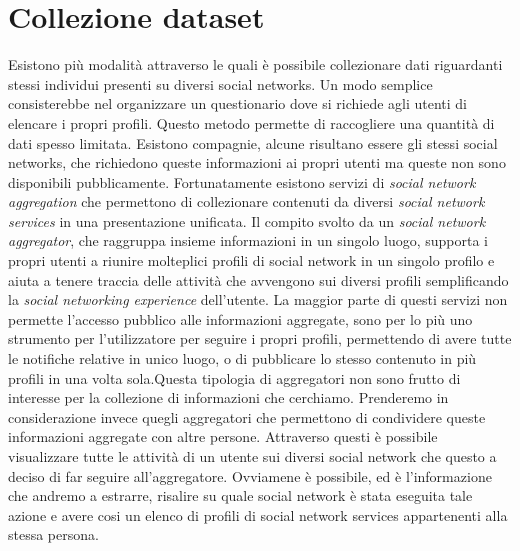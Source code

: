 \chapter{Collezione dataset}
\label{cap3}

Esistono più modalità attraverso le quali è possibile collezionare dati riguardanti stessi individui presenti su diversi social networks. Un modo semplice consisterebbe nel organizzare un questionario dove si richiede agli utenti di elencare i propri profili. Questo metodo permette di raccogliere una quantità di dati spesso limitata. Esistono compagnie, alcune risultano essere gli stessi social networks, che richiedono queste informazioni ai propri utenti ma queste non sono disponibili pubblicamente.
Fortunatamente esistono servizi di \textit{social network aggregation} che permettono di collezionare contenuti da diversi \textit{social network services} in una presentazione unificata. Il compito svolto da un \textit{social network aggregator}, che raggruppa insieme informazioni in un singolo luogo, supporta i propri utenti a riunire molteplici profili di social network in un singolo profilo e aiuta a tenere traccia delle attività che avvengono sui diversi profili semplificando la \textit{social networking experience} dell'utente.
La maggior parte di questi servizi non permette l'accesso pubblico alle informazioni aggregate, sono per lo più uno strumento per l'utilizzatore per seguire i propri profili, permettendo di avere tutte le notifiche relative in unico luogo, o di pubblicare lo stesso contenuto in più profili in una volta sola.Questa tipologia di aggregatori non sono frutto di interesse per la collezione di informazioni che cerchiamo.
Prenderemo in considerazione invece quegli aggregatori che permettono di condividere queste informazioni aggregate con altre persone. Attraverso questi è possibile visualizzare tutte le attività di un utente sui diversi social network che questo a deciso di far seguire all'aggregatore. Ovviamene è possibile, ed è l'informazione che andremo a estrarre, risalire su quale social network è stata eseguita tale azione e avere cosi un elenco di profili di social network services appartenenti alla stessa persona.
